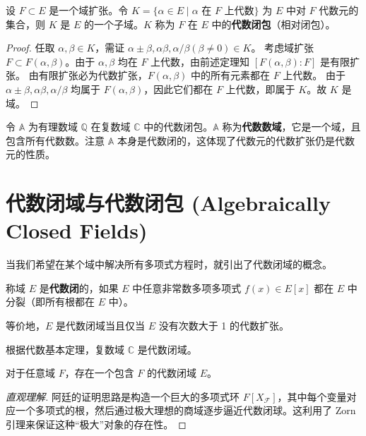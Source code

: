 \documentclass[11pt]{article}
\begin{document}
\begin{cntheorem}
    设 $F \subset E$ 是一个域扩张。令 $K = \{\alpha \in E \mid \alpha \text{ 在 } F \text{ 上代数}\}$ 为 $E$ 中对 $F$ 代数元的集合，则 $K$ 是 $E$ 的一个子域。$K$ 称为 $F$ 在 $E$ 中的\textbf{代数闭包}（相对闭包）。
\end{cntheorem}

\begin{proof}
    任取 $\alpha, \beta \in K$，需证 $\alpha \pm \beta, \alpha\beta, \alpha/\beta (\beta\neq 0) \in K$。
    考虑域扩张 $F \subset F(\alpha, \beta)$。由于 $\alpha, \beta$ 均在 $F$ 上代数，由前述定理知 $[F(\alpha, \beta) : F]$ 是有限扩张。
    由有限扩张必为代数扩张，$F(\alpha, \beta)$ 中的所有元素都在 $F$ 上代数。
    由于 $\alpha \pm \beta, \alpha\beta, \alpha/\beta$ 均属于 $F(\alpha, \beta)$，因此它们都在 $F$ 上代数，即属于 $K$。故 $K$ 是域。
\end{proof}

\begin{cnexample}
    令 $\mathbb{A}$ 为有理数域 $\mathbb{Q}$ 在复数域 $\mathbb{C}$ 中的代数闭包。$\mathbb{A}$ 称为\textbf{代数数域}，它是一个域，且包含所有代数数。注意 $\mathbb{A}$ 本身是代数闭的，这体现了代数元的代数扩张仍是代数元的性质。
\end{cnexample}

\section{代数闭域与代数闭包 (Algebraically Closed Fields)}

当我们希望在某个域中解决所有多项式方程时，就引出了代数闭域的概念。

\begin{cndefinition}[代数闭域]
    称域 $E$ 是\textbf{代数闭}的，如果 $E$ 中任意非常数多项多项式 $f(x) \in E[x]$ 都在 $E$ 中分裂（即所有根都在 $E$ 中）。
\end{cndefinition}

等价地，$E$ 是代数闭域当且仅当 $E$ 没有次数大于 1 的代数扩张。

\begin{cnexample}
    根据代数基本定理，复数域 $\mathbb{C}$ 是代数闭域。
\end{cnexample}

\begin{cntheorem}[阿廷定理]
    对于任意域 $F$，存在一个包含 $F$ 的代数闭域 $E$。
\end{cntheorem}

\begin{proof}[直观理解]
    阿廷的证明思路是构造一个巨大的多项式环 $F[X_{\mathcal{F}}]$，其中每个变量对应一个多项式的根，然后通过极大理想的商域逐步逼近代数闭球。这利用了 Zorn 引理来保证这种“极大”对象的存在性。
\end{proof}
\end{document}
